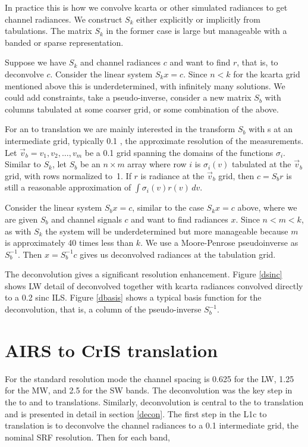 \documentclass[12pt]{article}
\begin{document}
In practice this is how we convolve kcarta or other simulated
radiances to get {\airs} channel radiances.  We construct $S_k$
either explicitly or implicitly from {\airs} {\srf} tabulations.
The matrix $S_k$ in the former case is large but manageable with a
banded or sparse representation.

Suppose we have $S_k$ and channel radiances $c$ and want to 
find $r$, that is, to deconvolve $c$.  Consider the linear system
$S_k x = c$.  Since $n < k$ for the kcarta grid mentioned above this
is underdetermined, with infinitely many solutions.  We could add
constraints, take a pseudo-inverse, consider a new matrix $S_b$ with
columns tabulated at some coarser grid, or some combination of the
above.

For an {\airs} to {\cris} translation we are mainly interested in 
the transform $S_b$ with {\srf}s at an intermediate grid, typically
0.1 {\wn}, the approximate resolution of the {\srf} measurements.
Let $\vec v_b = v_1,v_2,\ldots,v_m$ be a 0.1 {\wn} grid spanning the
domains of the functions $\sigma_i$.  Similar to $S_k$, let $S_b$ be
an $n\times m$ array where row $i$ is $\sigma_i(v)$ tabulated at the
$\vec v_b$ grid, with rows normalized to~1.  If $r$ is radiance at
the $\vec v_b$ grid, then $c = S_b r$ is still a reasonable
approximation of $\int\sigma_i(v)r(v)\,dv$.

Consider the linear system $S_b x = c$, similar to the case 
$S_k x = c$ above, where we are given $S_b$ and channel signals $c$
and want to find radiances $x$.  Since $n < m < k$, as with $S_k$
the system will be underdetermined but more manageable because $m$
is approximately 40 times less than $k$.  We use a Moore-Penrose
pseudoinverse as $S_b^{-1}$.  Then $x = S_b^{-1} c$ gives us
deconvolved radiances at the {\srf} tabulation grid. 

The {\airs} deconvolution gives a significant resolution enhancement.
Figure \ref{dsinc} shows LW detail of deconvolved {\airs} together
with kcarta radiances convolved directly to a 0.2 {\wn} sinc ILS.
Figure \ref{dbasis} shows a typical basis function for the {\airs}
deconvolution, that is, a column of the pseudo-inverse $S_b^{-1}$.

\FloatBarrier
\section{AIRS to CrIS translation}
\label{airs2cris}

For the {\cris} standard resolution mode the channel spacing is
0.625 {\wn} for the LW, 1.25 {\wn} for the MW, and 2.5 {\wn} for the
SW bands.  The {\iasi} deconvolution was the key step in the {\iasi}
to {\cris} and {\iasi} to {\airs} translations.  Similarly, {\airs}
deconvolution is central to the {\airs} to {\cris} translation and
is presented in detail in section \ref{decon}.  The first step in
the {\airs} L1c to {\cris} translation is to deconvolve the {\airs}
channel radiances to a 0.1 {\wn} intermediate grid, the nominal
{\airs} SRF resolution.  Then for each {\cris} band,
\end{document}

